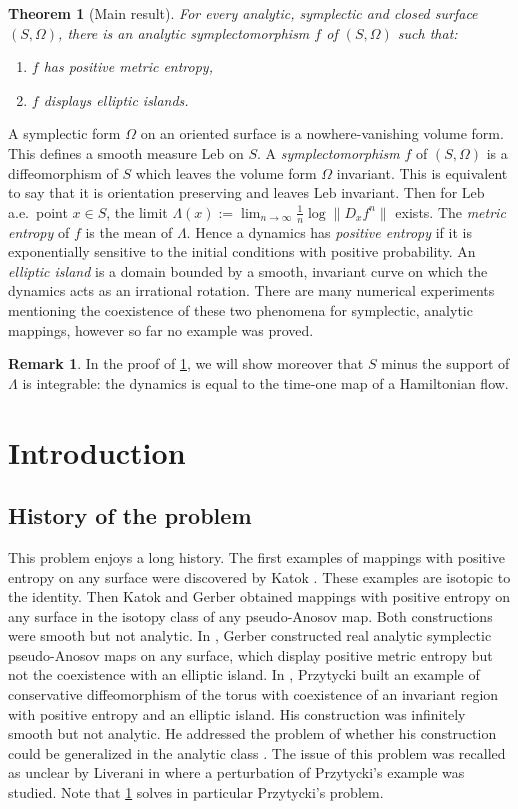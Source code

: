 \documentclass[JEP,XML,SOM,Unicode,NoFloatCountersInSection,Unicode,published]{cedram}
\newcommand\leb{\mathrm{Leb}}
\newtheorem{theo}{Theorem}
\theoremstyle{definition}
\newtheorem*{remark*}{Remark}
\begin{document}
\begin{theo}[Main result]\label{main}
For every analytic, symplectic and closed surface $(S,\Omega)$, there is an analytic symplectomorphism $f$ of $(S,\Omega)$ such that:
\begin{enumerate}
\item $f$ has positive metric entropy,
\item $f$ displays elliptic islands.
\end{enumerate}
\end{theo}
A symplectic form $\Omega$ on an oriented surface is a nowhere-vanishing volume form. This defines a smooth measure $\leb$ on $S$. A \emph{symplectomorphism} $f$ of $(S, \Omega)$ is a diffeomorphism of $S$ which leaves the volume form $\Omega$ invariant. This is equivalent to say that it is orientation preserving and leaves $\leb$ invariant. Then for $\leb$ a.e.\ point $x\in S$, the limit $\Lambda(x):= \lim_{n\to \infty} \frac1n \log \|D_xf^n\|$ exists. The
\emph{metric entropy} of $f$ is the mean of $\Lambda$. Hence a dynamics has \emph{positive entropy} if it is exponentially sensitive to the initial conditions with positive probability. An \emph{elliptic island} is a domain bounded by a smooth, invariant curve on which the dynamics acts as an irrational rotation. There are many numerical experiments mentioning the coexistence of these two phenomena for symplectic, analytic mappings, however so far no example was proved.

\begin{remark*}
In the proof of \cref{main}, we will show moreover that $S$ minus the support of $\Lambda$ is integrable: the dynamics is equal to the time-one map of a Hamiltonian flow.
\end{remark*}

\section{Introduction}
\subsection{History of the problem}
This problem enjoys a long history. The first exam\-ples of mappings with positive entropy on any surface were discovered by Katok \cite{Ka79}. These examples are isotopic to the identity. Then Katok and Gerber \cite{GK82} obtained mappings with positive entropy on any surface in the isotopy class of any pseudo-Anosov map. Both constructions were smooth but not analytic. In \cite{Ge85}, Gerber constructed real analytic symplectic pseudo-Anosov maps on any surface, which display positive metric entropy but not the coexistence with an elliptic \hbox{island}. In \cite{Pr82}, Przytycki built an example of conservative diffeomorphism of the torus with coexistence of an invariant region with positive entropy and an elliptic island. His construction was infinitely smooth but not analytic. He addressed the problem of whether his construction could be generalized in the analytic class \cite[Rem.\,1, p.\,461]{Pr82}. The issue of this problem was recalled as unclear by Liverani in \cite[Rem.\,2.4, p.\,3]{Li04} where a perturbation of Przytycki's example was studied. Note that \cref{main} solves in particular Przytycki's problem.
\end{document}
